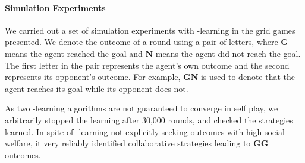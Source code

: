 
\vspace{\up}
\paragraph{Simulation Experiments}
\label{sec:qlearning}

We carried out a set of simulation experiments with \Q-learning in
the grid games presented.
%
We denote the outcome of a round using a pair of letters, where {\bf G} 
means the agent reached the goal and {\bf N} means the agent did not
reach the goal. The first letter in the pair represents the agent's
own outcome and the second represents its opponent's outcome. For
example, {\bf GN} is used to denote that the agent reaches its goal
while its opponent does not.

As two \Q-learning algorithms are not guaranteed to converge in
self play, we arbitrarily stopped the learning after 30,000 rounds,
and checked the strategies learned.  In spite of \Q-learning not
explicitly seeking outcomes with high social welfare, it very reliably
identified collaborative strategies leading to {\bf GG} outcomes.

